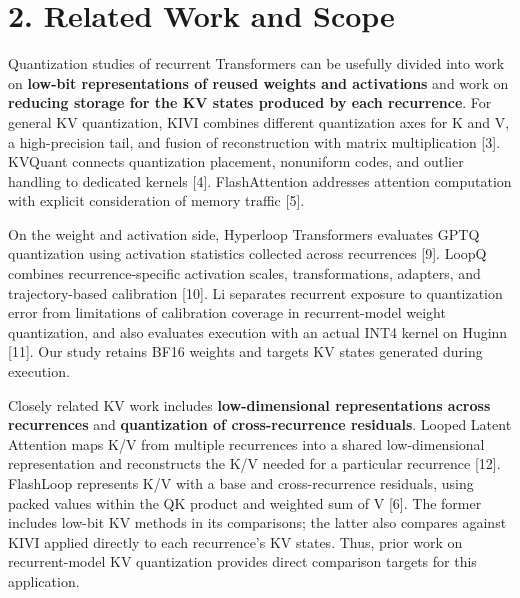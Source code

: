 \documentclass[10pt,a4paper]{article}
\begin{document}
\section{2. Related Work and Scope}\label{related-work-and-scope}

Quantization studies of recurrent Transformers can be usefully divided into work on \textbf{low-bit representations of reused weights and activations} and work on \textbf{reducing storage for the KV states produced by each recurrence}. For general KV quantization, KIVI combines different quantization axes for K and V, a high-precision tail, and fusion of reconstruction with matrix multiplication {[}3{]}. KVQuant connects quantization placement, nonuniform codes, and outlier handling to dedicated kernels {[}4{]}. FlashAttention addresses attention computation with explicit consideration of memory traffic {[}5{]}.

On the weight and activation side, Hyperloop Transformers evaluates GPTQ quantization using activation statistics collected across recurrences {[}9{]}. LoopQ combines recurrence-specific activation scales, transformations, adapters, and trajectory-based calibration {[}10{]}. Li separates recurrent exposure to quantization error from limitations of calibration coverage in recurrent-model weight quantization, and also evaluates execution with an actual INT4 kernel on Huginn {[}11{]}. Our study retains BF16 weights and targets KV states generated during execution.

Closely related KV work includes \textbf{low-dimensional representations across recurrences} and \textbf{quantization of cross-recurrence residuals}. Looped Latent Attention maps K/V from multiple recurrences into a shared low-dimensional representation and reconstructs the K/V needed for a particular recurrence {[}12{]}. FlashLoop represents K/V with a base and cross-recurrence residuals, using packed values within the QK product and weighted sum of V {[}6{]}. The former includes low-bit KV methods in its comparisons; the latter also compares against KIVI applied directly to each recurrence's KV states. Thus, prior work on recurrent-model KV quantization provides direct comparison targets for this application.
\end{document}
